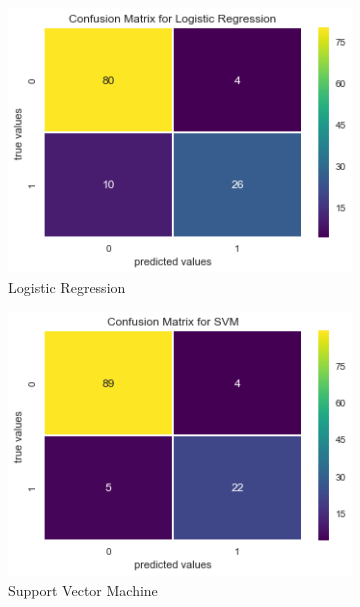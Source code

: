 \documentclass[12pt]{article}
\begin{document}
\begin{sloppypar}
\begin{figure}[H]
  \begin{subfigure}[b]{0.48\textwidth}
    \includegraphics[width=\textwidth]{CM_Logistic_Regression.png}
    \caption{Logistic Regression}
  \end{subfigure}
  \begin{subfigure}[b]{0.48\textwidth}
    \includegraphics[width=\textwidth]{CM_SVM.png}
    \caption{Support Vector Machine}
  \end{subfigure}
    \begin{subfigure}[b]{0.48\textwidth}

\end{subfigure}
\end{figure}
\end{sloppypar}
\end{document}
